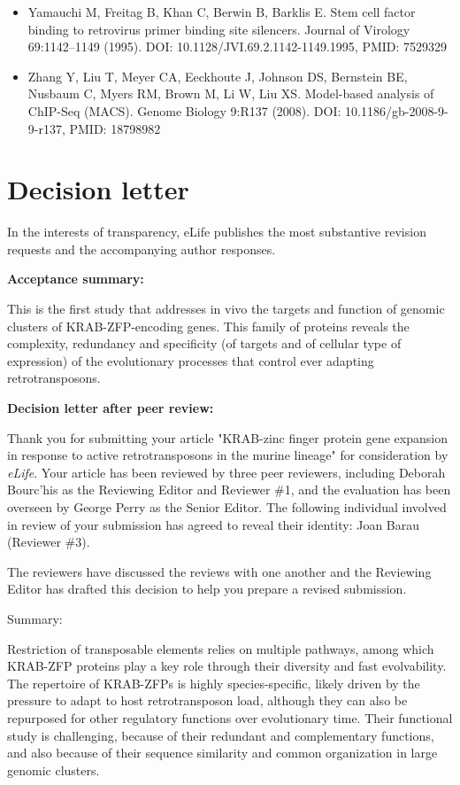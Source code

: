 \documentclass[11pt,a4paper]{article}
\begin{document}
\begin{itemize}
\item Yamauchi M, Freitag B, Khan C, Berwin B, Barklis E. Stem cell factor binding to retrovirus primer binding site silencers. Journal of Virology 69:1142–1149 (1995). DOI: 10.1128/JVI.69.2.1142-1149.1995, PMID: 7529329
\item Zhang Y, Liu T, Meyer CA, Eeckhoute J, Johnson DS, Bernstein BE, Nusbaum C, Myers RM, Brown M, Li W, Liu XS. Model-based analysis of ChIP-Seq (MACS). Genome Biology 9:R137 (2008). DOI: 10.1186/gb-2008-9-9-r137, PMID: 18798982
\end{itemize}

\section{Decision letter}

In the interests of transparency, eLife publishes the most substantive revision requests and the accompanying author responses.

\textbf{Acceptance summary:}

This is the first study that addresses in vivo the targets and function of genomic clusters of KRAB-ZFP-encoding genes. This family of proteins reveals the complexity, redundancy and specificity (of targets and of cellular type of expression) of the evolutionary processes that control ever adapting retrotransposons.

\textbf{Decision letter after peer review:}

Thank you for submitting your article "KRAB-zinc finger protein gene expansion in response to active retrotransposons in the murine lineage" for consideration by \textit{eLife}. Your article has been reviewed by three peer reviewers, including Deborah Bourc'his as the Reviewing Editor and Reviewer \#1, and the evaluation has been overseen by George Perry as the Senior Editor. The following individual involved in review of your submission has agreed to reveal their identity: Joan Barau (Reviewer \#3).

The reviewers have discussed the reviews with one another and the Reviewing Editor has drafted this decision to help you prepare a revised submission.

Summary:

Restriction of transposable elements relies on multiple pathways, among which KRAB-ZFP proteins play a key role through their diversity and fast evolvability. The repertoire of KRAB-ZFPs is highly species-specific, likely driven by the pressure to adapt to host retrotransposon load, although they can also be repurposed for other regulatory functions over evolutionary time. Their functional study is challenging, because of their redundant and complementary functions, and also because of their sequence similarity and common organization in large genomic clusters.
\end{document}
